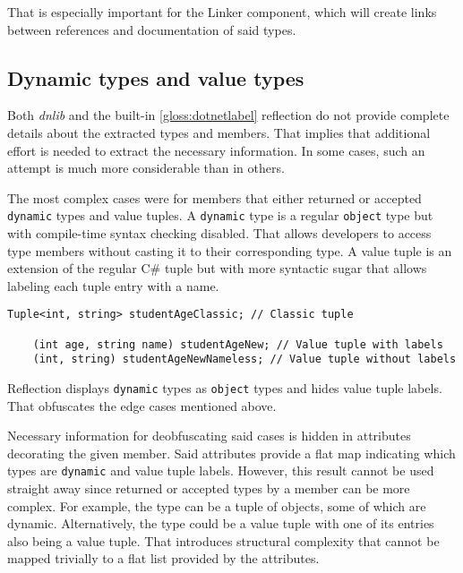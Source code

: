 That is especially important for the Linker component, which will create links between references and documentation of said types.

\subsection{Dynamic types and value types}

Both \textit{dnlib} and the built-in \ref{gloss:dotnetlabel} reflection do not provide complete details about the extracted types and members. That implies that additional effort is needed to extract the necessary information. In some cases, such an attempt is much more considerable than in others.

The most complex cases were for members that either returned or accepted \lstinline[language=csh]{dynamic} types and value tuples. A \lstinline[language=csh]{dynamic} type is a regular \lstinline[language=csh]{object} type but with compile-time syntax checking disabled. That allows developers to access type members without casting it to their corresponding type. A value tuple is an extension of the regular C\# tuple but with more syntactic sugar that allows labeling each tuple entry with a name.

\begin{lstlisting}[caption=C\# tuple and value tuple examples]
    Tuple<int, string> studentAgeClassic; // Classic tuple

    (int age, string name) studentAgeNew; // Value tuple with labels
    (int, string) studentAgeNewNameless; // Value tuple without labels
\end{lstlisting}

Reflection displays \lstinline[language=csh]{dynamic} types as \lstinline[language=csh]{object} types and hides value tuple labels. That obfuscates the edge cases mentioned above.

Necessary information for deobfuscating said cases is hidden in attributes decorating the given member. Said attributes provide a flat map indicating which types are \lstinline[language=csh]{dynamic} and value tuple labels. However, this result cannot be used straight away since returned or accepted types by a member can be more complex. For example, the type can be a tuple of objects, some of which are dynamic. Alternatively, the type could be a value tuple with one of its entries also being a value tuple. That introduces structural complexity that cannot be mapped trivially to a flat list provided by the attributes.

